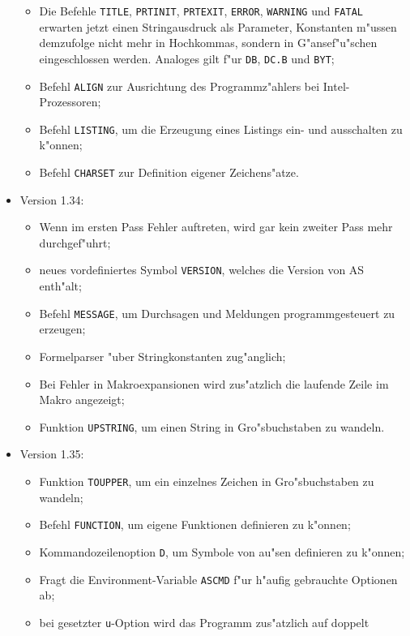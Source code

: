 \documentclass[12pt,a4paper,twoside]{report}
\newcommand{\tty}[1]{{\tt #1}}
\begin{document}
\begin{itemize}
{\begin{itemize}
      \item{Die Befehle \tty{TITLE}, \tty{PRTINIT}, \tty{PRTEXIT},
            \tty{ERROR}, \tty{WARNING} und \tty{FATAL} erwarten jetzt
	    einen Stringausdruck als Parameter, Konstanten
            m"ussen demzufolge nicht mehr in Hochkommas, sondern in
            G"ansef"u"schen eingeschlossen werden. Analoges gilt f"ur \tty{DB},
            \tty{DC.B} und \tty{BYT};}
      \item{Befehl \tty{ALIGN} zur Ausrichtung des Programmz"ahlers bei Intel-
            Prozessoren;}
      \item{Befehl \tty{LISTING}, um die Erzeugung eines Listings ein- und
            ausschalten zu k"onnen;}
      \item{Befehl \tty{CHARSET} zur Definition eigener Zeichens"atze.}
      \end{itemize}}
\item{Version 1.34:
      \begin{itemize}
      \item{Wenn im ersten Pass Fehler auftreten, wird gar kein zweiter
            Pass mehr durchgef"uhrt;}
      \item{neues vordefiniertes Symbol \tty{VERSION}, welches die Version von
            AS enth"alt;}
      \item{Befehl \tty{MESSAGE}, um Durchsagen und Meldungen programmgesteuert
            zu erzeugen;}
      \item{Formelparser "uber Stringkonstanten zug"anglich;}
      \item{Bei Fehler in Makroexpansionen wird zus"atzlich die laufende
            Zeile im Makro angezeigt;}
      \item{Funktion \tty{UPSTRING}, um einen String in Gro"sbuchstaben zu
            wandeln.}
      \end{itemize}}
\item{Version 1.35:
      \begin{itemize}
      \item{Funktion \tty{TOUPPER}, um ein einzelnes Zeichen in Gro"sbuchstaben
            zu wandeln;}
      \item{Befehl \tty{FUNCTION}, um eigene Funktionen definieren zu k"onnen;}
      \item{Kommandozeilenoption \tty{D}, um Symbole von au"sen definieren zu
            k"onnen;}
      \item{Fragt die Environment-Variable \tty{ASCMD} f"ur h"aufig gebrauchte
            Optionen ab;}
      \item{bei gesetzter \tty{u}-Option wird das Programm zus"atzlich auf doppelt
}
\end{itemize}}
\end{itemize}
\end{document}
